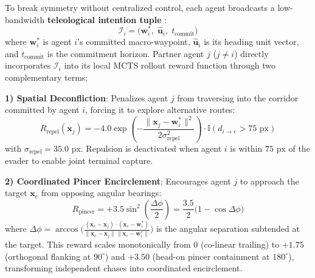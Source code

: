 \documentclass[conference]{IEEEtran}
\begin{document}
To break symmetry without centralized control, each agent broadcasts a low-bandwidth \textbf{teleological intention tuple} \cite{macalpine2018customized}:
\begin{equation}
    \mathcal{I}_i = \big( \mathbf{w}_i^*, \; \hat{\mathbf{u}}_i, \; t_{\text{commit}} \big)
\end{equation}
where $\mathbf{w}_i^*$ is agent $i$'s committed macro-waypoint, $\hat{\mathbf{u}}_i$ is its heading unit vector, and $t_{\text{commit}}$ is the commitment horizon. Partner agent $j$ ($j \neq i$) directly incorporates $\mathcal{I}_i$ into its local MCTS rollout reward function through two complementary terms:

\textbf{1) Spatial Deconfliction}: Penalizes agent $j$ from traversing into the corridor committed by agent $i$, forcing it to explore alternative routes:
\begin{equation}
    R_{\text{repel}}(\mathbf{x}_j) = -4.0 \exp\left( -\frac{\|\mathbf{x}_j - \mathbf{w}_i^*\|^2}{2 \sigma_{\text{repel}}^2} \right) \cdot \mathbb{I}(d_{i \to e} > 75\text{ px})
\end{equation}
with $\sigma_{\text{repel}} = 35.0\text{ px}$. Repulsion is deactivated when agent $i$ is within $75\text{ px}$ of the evader to enable joint terminal capture.

\textbf{2) Coordinated Pincer Encirclement}: Encourages agent $j$ to approach the target $\mathbf{x}_e$ from opposing angular bearings:
\begin{equation}
    R_{\text{pincer}} = +3.5 \sin^2\left(\frac{\Delta\phi}{2}\right) = \frac{3.5}{2} \big(1 - \cos\Delta\phi\big)
\end{equation}
where $\Delta\phi = \arccos\big( \frac{(\mathbf{x}_e - \mathbf{x}_j) \cdot (\mathbf{x}_e - \mathbf{w}_i^*)}{\|\mathbf{x}_e - \mathbf{x}_j\| \|\mathbf{x}_e - \mathbf{w}_i^*\|} \big)$ is the angular separation subtended at the target. This reward scales monotonically from $0$ (co-linear trailing) to $+1.75$ (orthogonal flanking at $90^\circ$) and $+3.50$ (head-on pincer containment at $180^\circ$), transforming independent chases into coordinated encirclement.
\end{document}
